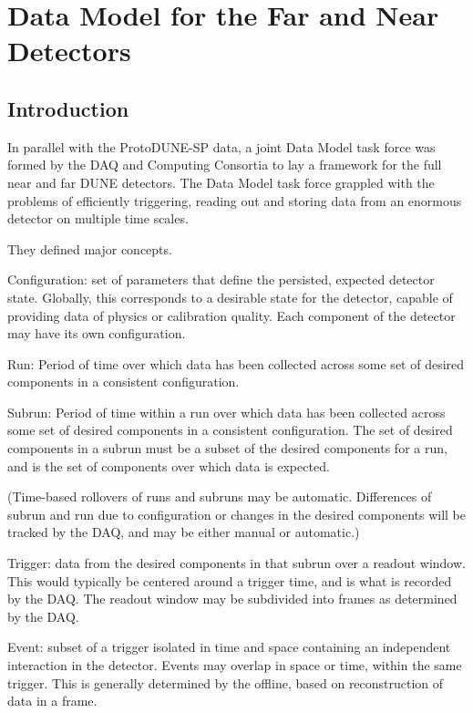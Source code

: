   \section{Data Model for the Far and Near Detectors}
  \label{ch:exec-comp-mod}

  \subsection{Introduction}
  \label{ch:exec-comp-mod-int}
  In parallel with the ProtoDUNE-SP data, a joint Data Model task force was formed by the DAQ and Computing Consortia to lay a framework for the full near and far DUNE detectors.
  The Data Model task force grappled with the problems of efficiently triggering, reading out and storing data from an enormous detector on multiple time scales.

  They defined major concepts.

  \begin{description}

  \item{Configuration:} set of parameters that define the persisted, expected detector state. Globally, this corresponds to a desirable state for the detector, capable of providing data of physics or calibration quality. Each component of the detector may have its own configuration.

  \item{Run:} Period of time over which data has been collected across some set of desired components in a consistent configuration.

  \item{Subrun:} Period of time within a run over which data has been collected across some set of desired components in a consistent configuration. The set of desired components in a subrun must be a subset of the desired components for a run, and is the set of components over which data is expected.

    (Time-based rollovers of runs and subruns may be automatic. Differences of subrun and run due to configuration or changes in the desired components will be tracked by the DAQ, and may be either manual or automatic.)

  \item{Trigger:} data from the desired components in that subrun over a readout window. This would typically be centered around a trigger time, and is what is recorded by the DAQ. The readout window may be subdivided into frames as determined by the DAQ.

  \item{Event:} subset of a trigger isolated in time and space containing an independent interaction in the detector. Events may overlap in space or time, within the same trigger. This is generally determined by the offline, based on reconstruction of data in a frame.

  \end{description}

